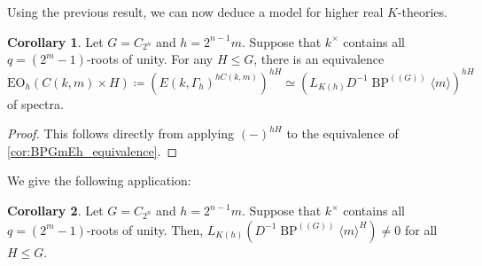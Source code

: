 \documentclass[a4paper, 10pt]{article}
\newcommand{\BPGm}{{\BP^{(\!(G)\!)}}\langle m\rangle}
\newcommand{\BP}{\operatorname{BP}}
\newcommand{\EO}{\mathrm{EO}}
\theoremstyle{definition}
\newtheorem{corollary}[corollary]{Corollary}
\begin{document}
Using the previous result, we can now deduce a model for higher real $K$-theories.

\begin{corollary}\label{cor:fixed_points_EOn_equivalence}
    Let $G = C_{2^n}$ and $h = 2^{n-1}m$. Suppose that $k^{\times}$ contains all $q = (2^m-1)$-roots of unity. For any \(H\leq G\), there is an equivalence
    \[  
    \EO_h(C(k,m) \times H) \coloneqq \left(E(k,\Gamma_h)^{hC(k,m)}\right)^{hH} \simeq
    \left(L_{K(h)}D^{-1}\BPGm\right)^{hH}  \] 
    of spectra.
\end{corollary}
\begin{proof}
    This follows directly from applying \((-)^{hH}\) to the equivalence of \cref{cor:BPGmEh_equivalence}.
\end{proof}

We give the following application:

\begin{corollary}
    Let $G = C_{2^n}$ and $h = 2^{n-1}m$. Suppose that $k^{\times}$ contains all $q = (2^m-1)$-roots of unity. Then, $L_{K(h)}\left(D^{-1}\BPGm^{H}\right)\neq 0$ for all $H \leq G$.
\end{corollary}
\end{document}
